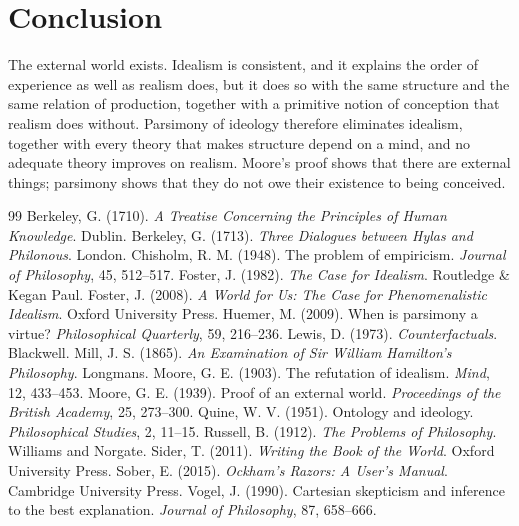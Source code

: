\documentclass{situationist-preprint}
\begin{document}
\section{Conclusion}

The external world exists. Idealism is consistent, and it explains the order of experience as well as realism does, but it does so with the same structure and the same relation of production, together with a primitive notion of conception that realism does without. Parsimony of ideology therefore eliminates idealism, together with every theory that makes structure depend on a mind, and no adequate theory improves on realism. Moore's proof shows that there are external things; parsimony shows that they do not owe their existence to being conceived.

\begin{thebibliography}{99}\small
{} Berkeley, G. (1710). \emph{A Treatise Concerning the Principles of Human Knowledge}. Dublin.
 Berkeley, G. (1713). \emph{Three Dialogues between Hylas and Philonous}. London.
 Chisholm, R. M. (1948). The problem of empiricism. \emph{Journal of Philosophy}, 45, 512--517.
 Foster, J. (1982). \emph{The Case for Idealism}. Routledge \& Kegan Paul.
 Foster, J. (2008). \emph{A World for Us: The Case for Phenomenalistic Idealism}. Oxford University Press.
 Huemer, M. (2009). When is parsimony a virtue? \emph{Philosophical Quarterly}, 59, 216--236.
 Lewis, D. (1973). \emph{Counterfactuals}. Blackwell.
 Mill, J. S. (1865). \emph{An Examination of Sir William Hamilton's Philosophy}. Longmans.
 Moore, G. E. (1903). The refutation of idealism. \emph{Mind}, 12, 433--453.
 Moore, G. E. (1939). Proof of an external world. \emph{Proceedings of the British Academy}, 25, 273--300.
 Quine, W. V. (1951). Ontology and ideology. \emph{Philosophical Studies}, 2, 11--15.
 Russell, B. (1912). \emph{The Problems of Philosophy}. Williams and Norgate.
 Sider, T. (2011). \emph{Writing the Book of the World}. Oxford University Press.
 Sober, E. (2015). \emph{Ockham's Razors: A User's Manual}. Cambridge University Press.
 Vogel, J. (1990). Cartesian skepticism and inference to the best explanation. \emph{Journal of Philosophy}, 87, 658--666.
\end{thebibliography}
\end{document}
